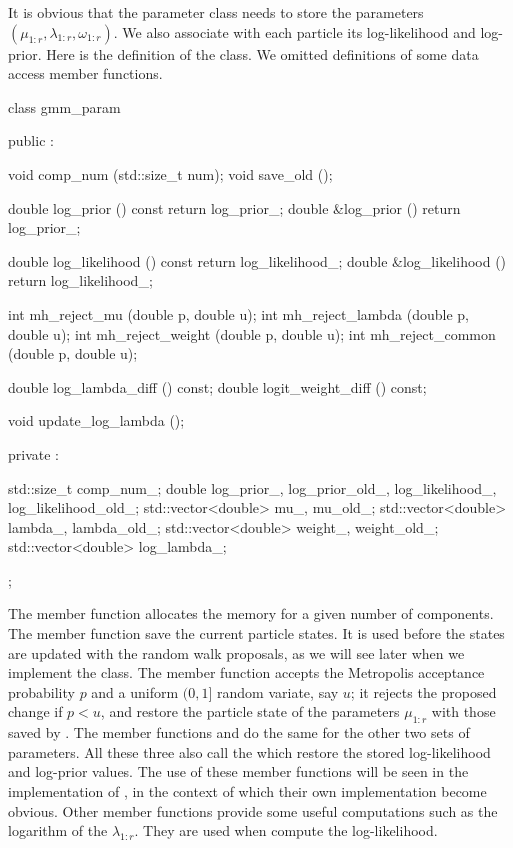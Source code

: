\documentclass[11pt, fontset=Minion, showoverfull,
bib, biblatexstyle=numeric, mintcode, minted=cache]{marticle}
\begin{document}
It is obvious that the parameter class  needs to store
the parameters $(\mu_{1:r},\lambda_{1:r},\omega_{1:r})$. We also associate
with each particle its log-likelihood and log-prior. Here is the definition of
the  class. We omitted definitions of some data access
member functions.
\begin{cppcode}
class gmm_param
{
    public :

    void comp_num (std::size_t num);
    void save_old ();

    double log_prior () const {return log_prior_;}
    double &log_prior () {return log_prior_;}

    double log_likelihood () const {return log_likelihood_;}
    double &log_likelihood () {return log_likelihood_;}

    int mh_reject_mu (double p, double u);
    int mh_reject_lambda (double p, double u);
    int mh_reject_weight (double p, double u);
    int mh_reject_common (double p, double u);

    double log_lambda_diff () const;
    double logit_weight_diff () const;

    void update_log_lambda ();

    private :

    std::size_t comp_num_;
    double log_prior_, log_prior_old_, log_likelihood_, log_likelihood_old_;
    std::vector<double> mu_, mu_old_;
    std::vector<double> lambda_, lambda_old_;
    std::vector<double> weight_, weight_old_;
    std::vector<double> log_lambda_;
};
\end{cppcode}
The  member function allocates the memory for a given
number of components. The  member function save the
current particle states. It is used before the states are updated with the
random walk proposals, as we will see later when we implement the
 class. The  member function
accepts the Metropolis acceptance probability $p$ and a uniform $(0,1]$ random
variate, say $u$; it rejects the proposed change if $p < u$, and restore the
particle state of the parameters $\mu_{1:r}$ with those saved by
. The member functions  and
 do the same for the other two sets of parameters.
All these three also call the  which restore the
stored log-likelihood and log-prior values. The use of these member functions
will be seen in the implementation of , in the context
of which their own implementation become obvious. Other member functions
provide some useful computations such as the logarithm of the $\lambda_{1:r}$.
They are used when compute the log-likelihood.
\end{document}
